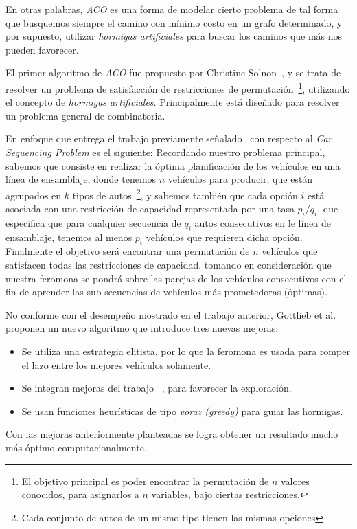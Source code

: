 En otras palabras, \emph{ACO} es una forma de modelar cierto problema de tal forma
que busquemos siempre el camino con mínimo costo en un grafo determinado, y por supuesto,
utilizar \emph{hormigas artificiales} para buscar los caminos que más nos pueden favorecer.


El primer algoritmo de \emph{ACO} fue propuesto por Christine Solnon~\cite{Sol00},
y se trata de resolver un problema de satisfacción de restricciones de permutación~\footnote{
El objetivo principal es poder encontrar la permutación de $n$ valores conocidos,
para asignarlos a $n$ variables, bajo ciertas restricciones.
},
utilizando el concepto de \emph{hormigas artificiales}. Principalmente está diseñado
para resolver un problema general de combinatoria.

En enfoque que entrega el trabajo previamente señalado~\cite{Sol00} con respecto
al \emph{Car Sequencing Problem} es el siguiente:
Recordando nuestro problema principal, sabemos que consiste
en realizar la óptima planificación de los vehículos en una línea de ensamblaje,
donde tenemos $n$ vehículos para producir, que están agrupados en $k$ tipos
de autos~\footnote{
Cada conjunto de autos de un mismo tipo tienen las mismas opciones
}, y sabemos también que cada opción $i$ está asociada con una restricción de capacidad
representada por una tasa $p_i/q_i$, que especifica que para cualquier secuencia
de $q_i$ autos consecutivos en le línea de ensamblaje, tenemos al menos $p_i$ vehículos
que requieren dicha opción.
Finalmente el objetivo será encontrar una permutación de $n$ vehículos que satisfacen
todas las restricciones de capacidad, tomando en consideración que nuestra feromona
se pondrá sobre las parejas de los vehículos consecutivos con el fin de aprender
las sub-secuencias de vehículos más prometedoras (óptimas).

No conforme con el desempeño mostrado en el trabajo anterior, Gottlieb et al.~\cite{GPS03}
proponen un nuevo algoritmo que introduce tres nuevas mejoras:
\begin{itemize}
	\item Se utiliza una estrategia elitista, por lo que la feromona es usada para romper el lazo entre los mejores vehículos solamente.
	\item Se integran mejoras del trabajo ~\cite{Stu}, para favorecer la exploración.
	\item Se usan funciones heurísticas de tipo \emph{voraz (greedy)} para guiar las hormigas.
\end{itemize}
Con las mejoras anteriormente planteadas se logra obtener un resultado mucho más óptimo computacionalmente.


